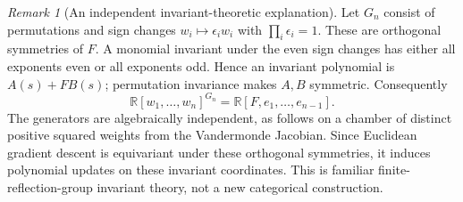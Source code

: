 \documentclass[11pt]{article}
\theoremstyle{definition}\newtheorem{definition}[theorem]{Definition}
\theoremstyle{remark}\newtheorem{remark}[theorem]{Remark}
\newcommand{\R}{\mathbb R}
\begin{document}
\begin{remark}[An independent invariant-theoretic explanation]
Let $G_n$ consist of permutations and sign changes $w_i\mapsto\epsilon_iw_i$ with $\prod_i\epsilon_i=1$. These are orthogonal symmetries of $F$. A monomial invariant under the even sign changes has either all exponents even or all exponents odd. Hence an invariant polynomial is $A(s)+F B(s)$; permutation invariance makes $A,B$ symmetric. Consequently
\[
 \R[w_1,\ldots,w_n]^{G_n}=\R[F,e_1,\ldots,e_{n-1}].
\]
The generators are algebraically independent, as follows on a chamber of distinct positive squared weights from the Vandermonde Jacobian. Since Euclidean gradient descent is equivariant under these orthogonal symmetries, it induces polynomial updates on these invariant coordinates. This is familiar finite-reflection-group invariant theory, not a new categorical construction.
\end{remark}
\end{document}

